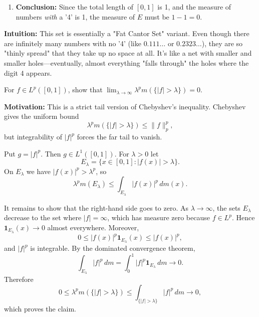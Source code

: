 \begin{solution}
\begin{enumerate}
    \item \textbf{Conclusion:} Since the total length of $[0,1]$ is 1, and the measure of numbers \textit{with} a '4' is 1, the measure of $E$ must be $1 - 1 = 0$.
\end{enumerate}

\bigskip

\textbf{Intuition:} 
This set is essentially a "Fat Cantor Set" variant. Even though there are infinitely many numbers with no '4' (like $0.111\dots$ or $0.2323\dots$), they are so "thinly spread" that they take up no space at all. It's like a net with smaller and smaller holes—eventually, almost everything "falls through" the holes where the digit 4 appears.
\end{solution}

\begin{exercise}
\label{analysis:2012:10}
For $f \in L^p([0,1])$, show that $\lim_{\lambda\to\infty} \lambda^p m(\{|f|>\lambda\}) = 0$.
\end{exercise}

\begin{solution}
\textbf{Motivation:} This is a strict tail version of Chebyshev's inequality. Chebyshev gives the uniform bound
\[
\lambda^p m(\{|f|>\lambda\}) \leq \|f\|_p^p,
\]
but integrability of $|f|^p$ forces the far tail to vanish.

Put $g=|f|^p$. Then $g\in L^1([0,1])$. For $\lambda>0$ let
\[
E_\lambda=\{x\in[0,1]: |f(x)|>\lambda\}.
\]
On $E_\lambda$ we have $|f(x)|^p>\lambda^p$, so
\[
\lambda^p m(E_\lambda)\leq \int_{E_\lambda}|f(x)|^p\,dm(x).
\]

It remains to show that the right-hand side goes to zero. As $\lambda\to\infty$, the sets $E_\lambda$ decrease to the set where $|f|=\infty$, which has measure zero because $f\in L^p$. Hence $\mathbf 1_{E_\lambda}(x)\to 0$ almost everywhere. Moreover,
\[
0\leq |f(x)|^p\mathbf 1_{E_\lambda}(x)\leq |f(x)|^p,
\]
and $|f|^p$ is integrable. By the dominated convergence theorem,
\[
\int_{E_\lambda}|f|^p\,dm
=\int_0^1 |f|^p\mathbf 1_{E_\lambda}\,dm \to 0.
\]
Therefore
\[
0\leq \lambda^p m(\{|f|>\lambda\})
\leq \int_{\{|f|>\lambda\}} |f|^p\,dm \to 0,
\]
which proves the claim.
\end{solution}

